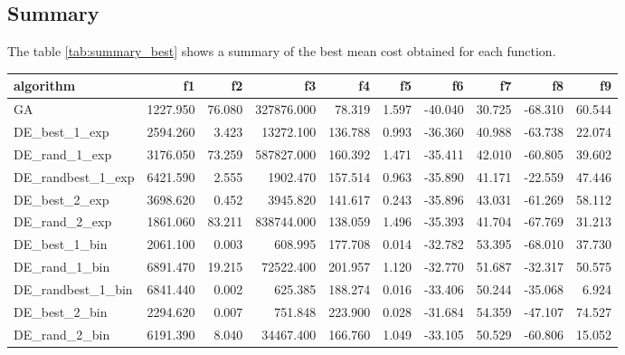 \documentclass[12pt]{article}
\begin{document}
    \subsection{Summary}
    

The table \ref{tab:summary_best} shows a summary of the best mean cost obtained for each function.







    \begin{table}[H]
        \centering
        \tiny 
        
        \begin{adjustbox}{width=1\textwidth}
\begin{tabular}{lrrrrrrrrr}
    \toprule
    algorithm &       f1 &       f2 &            f3 &      f4 &      f5 &      f6 &     f7 &      f8 &      f9 \\
    \midrule
    GA & 1227.950 & 76.080 & 327876.000 & 78.319 & 1.597 & -40.040 & 30.725 & -68.310 & 60.544 \\
    DE\_best\_1\_exp & 2594.260 & 3.423 & 13272.100 & 136.788 & 0.993 & -36.360 & 40.988 & -63.738 & 22.074 \\
    DE\_rand\_1\_exp & 3176.050 & 73.259 & 587827.000 & 160.392 & 1.471 & -35.411 & 42.010 & -60.805 & 39.602 \\
    DE\_randbest\_1\_exp & 6421.590 & 2.555 & 1902.470 & 157.514 & 0.963 & -35.890 & 41.171 & -22.559 & 47.446 \\
    DE\_best\_2\_exp & 3698.620 & 0.452 & 3945.820 & 141.617 & 0.243 & -35.896 & 43.031 & -61.269 & 58.112 \\
    DE\_rand\_2\_exp & 1861.060 & 83.211 & 838744.000 & 138.059 & 1.496 & -35.393 & 41.704 & -67.769 & 31.213 \\
    DE\_best\_1\_bin & 2061.100 & 0.003 & 608.995 & 177.708 & 0.014 & -32.782 & 53.395 & -68.010 & 37.730 \\
    DE\_rand\_1\_bin & 6891.470 & 19.215 & 72522.400 & 201.957 & 1.120 & -32.770 & 51.687 & -32.317 & 50.575 \\
    DE\_randbest\_1\_bin & 6841.440 & 0.002 & 625.385 & 188.274 & 0.016 & -33.406 & 50.244 & -35.068 & 6.924 \\
    DE\_best\_2\_bin & 2294.620 & 0.007 & 751.848 & 223.900 & 0.028 & -31.684 & 54.359 & -47.107 & 74.527 \\
    DE\_rand\_2\_bin & 6191.390 & 8.040 & 34467.400 & 166.760 & 1.049 & -33.105 & 50.529 & -60.806 & 15.052 \\

\end{tabular}
\end{adjustbox}
\end{table}
\end{document}
